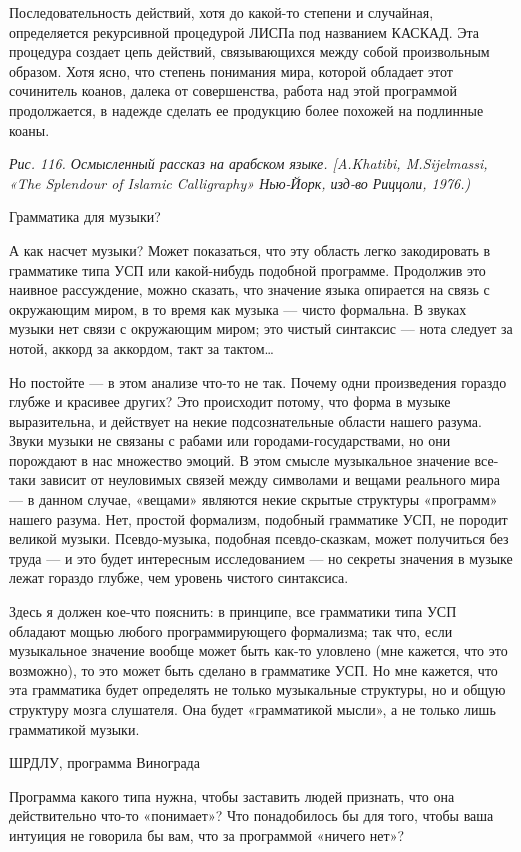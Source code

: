 \documentclass[../main.tex]{subfiles}
\begin{document}
Последовательность действий, хотя до какой-то степени и случайная, определяется рекурсивной процедурой ЛИСПа под названием КАСКАД. Эта процедура создает цепь действий, связывающихся между собой произвольным образом. Хотя ясно, что степень понимания мира, которой обладает этот сочинитель коанов, далека от совершенства, работа над этой программой продолжается, в надежде сделать ее продукцию более похожей на подлинные коаны.

\emph{Рис. 116. Осмысленный рассказ на арабском языке. {[}A.Khatibi, M.Sijelmassi, «The Splendour of Islamic Calligraphy» Нью-Йорк, изд-во Риццоли, 1976.)}

Грамматика для музыки?

А как насчет музыки? Может показаться, что эту область легко закодировать в грамматике типа УСП или какой-нибудь подобной программе. Продолжив это наивное рассуждение, можно сказать, что значение языка опирается на связь с окружающим миром, в то время как музыка --- чисто формальна. В звуках музыки нет связи с окружающим миром; это чистый синтаксис --- нота следует за нотой, аккорд за аккордом, такт за тактом\ldots{}

Но постойте --- в этом анализе что-то не так. Почему одни произведения гораздо глубже и красивее других? Это происходит потому, что форма в музыке выразительна, и действует на некие подсознательные области нашего разума. Звуки музыки не связаны с рабами или городами-государствами, но они порождают в нас множество эмоций. В этом смысле музыкальное значение все-таки зависит от неуловимых связей между символами и вещами реального мира --- в данном случае, «вещами» являются некие скрытые структуры «программ» нашего разума. Нет, простой формализм, подобный грамматике УСП, не породит великой музыки. Псевдо-музыка, подобная псевдо-сказкам, может получиться без труда --- и это будет интересным исследованием --- но секреты значения в музыке лежат гораздо глубже, чем уровень чистого синтаксиса.

Здесь я должен кое-что пояснить: в принципе, все грамматики типа УСП обладают мощью любого программирующего формализма; так что, если музыкальное значение вообще может быть как-то уловлено (мне кажется, что это возможно), то это может быть сделано в грамматике УСП. Но мне кажется, что эта грамматика будет определять не только музыкальные структуры, но и общую структуру мозга слушателя. Она будет «грамматикой мысли», а не только лишь грамматикой музыки.

ШРДЛУ, программа Винограда

Программа какого типа нужна, чтобы заставить людей признать, что она действительно что-то «понимает»? Что понадобилось бы для того, чтобы ваша интуиция не говорила бы вам, что за программой «ничего нет»?
\end{document}
